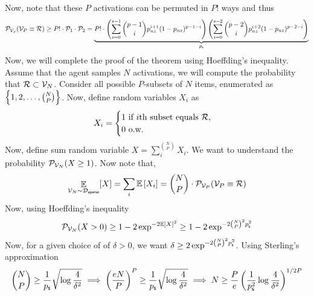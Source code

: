     Now, note that these $P$ activations can be permuted in $P!$ ways and thus
    \begin{align}
        \cP_{\cV_p}(\cV_P \equiv \cR) \ge P!\cdot\cP_1 \cdot \cP_2 = \underbrace{\textcolor{black}{P!\cdot \paren{\sum_{i = 0}^{s-1} \binom{p-1}{i} p_{nz}^{i+1} (1 - p_{nz})^{p-1-i}} \paren{\sum_{i = 0}^{s-2} \binom{p-2}{i} p_{nz}^{i+2} (1 - p_{nz})^{p-2-i}}}}_{p_{\sf{s}}}\label{eq: lb}
    \end{align}
    Now, we will complete the proof of the theorem using Hoeffding's inequality. Assume that the agent samples $N$ activations, we will compute the probability that $\cR \subset \cV_N$. Consider all possible $P$-subsets of $N$ items, enumerated as $\curlybracket{1,2,\ldots, \binom{N}{P}}$. Now, define random variables $X_i$ as
    \begin{align*}
        X_i = \begin{cases}
            1 \textnormal{ if $i$th subset equals } \cR,\\
            0 \textnormal{ o.w.}
        \end{cases}
    \end{align*}
    Now, define sum random variable $X = \sum_i^{\binom{N}{P}} X_i$. We want to understand the probability $\cP_{\cV_N}(X \ge 1)$. Now note that,
    \begin{align*}
        \expctover{\cV_N \sim \cD_{\sf{sparse}}}{X} = \sum_i \expct{X_i} = \binom{N}{P}\cdot \cP_{\cV_P}(\cV_P \equiv \cR)
    \end{align*}
    Now, using Hoeffding's inequality
    \begin{align*}
        \cP_{\cV_N}(X > 0) \ge 1 - 2\exp^{-2\expct{X}^2} \ge 1 - 2\exp^{-2\binom{N}{P}^2 p_{\sf{s}}^2}
    \end{align*}
    Now, for a given choice of of $\delta > 0$, we want $\delta \ge 2\exp^{-2\binom{N}{P}^2 p_{\sf{s}}^2}$. Using Sterling's approximation
    \begin{align*}
          \binom{N}{P} \ge \frac{1}{p_{\sf{s}}} \sqrt{\log \frac{4}{\delta^2}}
        \implies \paren{\frac{eN}{P}}^P \ge \frac{1}{p_{\sf{s}}} \sqrt{\log \frac{4}{\delta^2}} \implies N \ge \frac{P}{e} \paren{\frac{1}{p_{\sf{s}}^2} \log \frac{4}{\delta^2}}^{1/2P}
    \end{align*}

\newpage














